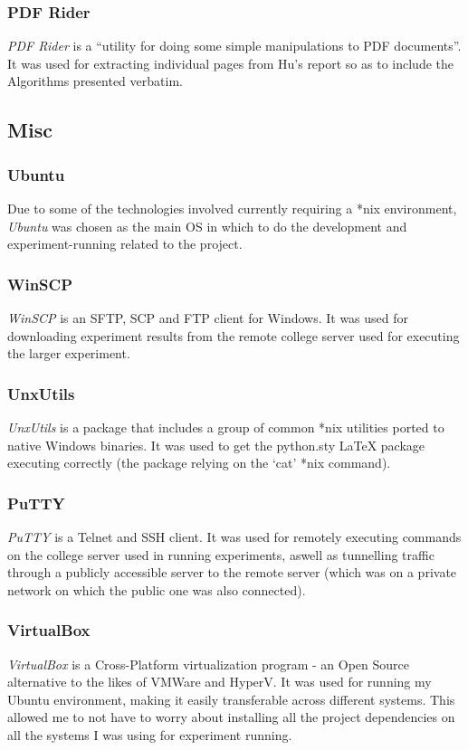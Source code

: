 \documentclass[a4paper,11pt]{report}
\begin{document}
\subsubsection*{PDF Rider}
\emph{PDF Rider} \citep{prog:pdfrider} is a ``utility for doing some simple manipulations to PDF documents''. It was used for extracting individual pages from Hu's report so as to include the Algorithms presented verbatim.

\subsection{Misc}

\subsubsection*{Ubuntu}
Due to some of the technologies involved currently requiring a *nix environment, \emph{Ubuntu} \citep{prog:ubuntu} was chosen as the main OS in which to do the development and experiment-running related to the project.

\subsubsection*{WinSCP}
\emph{WinSCP} \citep{prog:winscp} is an SFTP, SCP and FTP client for Windows. It was used for downloading experiment results from the remote college server used for executing the larger experiment.

\subsubsection*{UnxUtils}
\emph{UnxUtils} \citep{prog:unxutils} is a package that includes a group of common *nix utilities ported to native Windows binaries. It was used to get the python.sty \LaTeX{} package executing correctly (the package relying on the `cat' *nix command).

\subsubsection*{PuTTY}
\emph{PuTTY} \citep{prog:putty} is a Telnet and SSH client. It was used for remotely executing commands on the college server used in running experiments, aswell as tunnelling traffic through a publicly accessible server to the remote server (which was on a private network on which the public one was also connected).

\subsubsection*{VirtualBox}
\emph{VirtualBox} \citep{prog:virtualbox} is a Cross-Platform virtualization program - an Open Source alternative to the likes of VMWare and HyperV. It was used for running my Ubuntu environment, making it easily transferable across different systems. This allowed me to not have to worry about installing all the project dependencies on all the systems I was using for experiment running.
\end{document}
